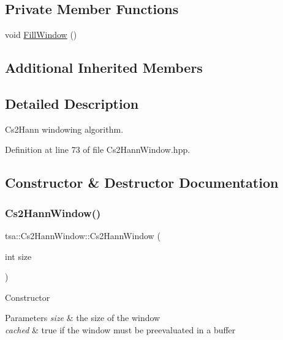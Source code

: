 \subsection*{Private Member Functions}
\begin{DoxyCompactItemize}
\item 
void \hyperlink{classtsa_1_1_cs2_hann_window_a0da151916492d8ab9504ee40872131a2}{Fill\+Window} ()
\end{DoxyCompactItemize}
\subsection*{Additional Inherited Members}


\subsection{Detailed Description}
Cs2\+Hann windowing algorithm. 

Definition at line 73 of file Cs2\+Hann\+Window.\+hpp.



\subsection{Constructor \& Destructor Documentation}
\mbox{\label{classtsa_1_1_cs2_hann_window_aaa914c46b51ba07093b04a473a164699}} 
\subsubsection{\texorpdfstring{Cs2\+Hann\+Window()}{Cs2HannWindow()}\hspace{0.1cm}{\footnotesize\ttfamily [1/2]}}
{\footnotesize\ttfamily tsa\+::\+Cs2\+Hann\+Window\+::\+Cs2\+Hann\+Window (\begin{DoxyParamCaption}\item[{int}]{size }\end{DoxyParamCaption})\hspace{0.3cm}{\ttfamily [inline]}}

Constructor


\begin{DoxyParams}{Parameters}
{\em size} & the size of the window \\
\hline
{\em cached} & true if the window must be preevaluated in a buffer \\
\hline
\end{DoxyParams}


